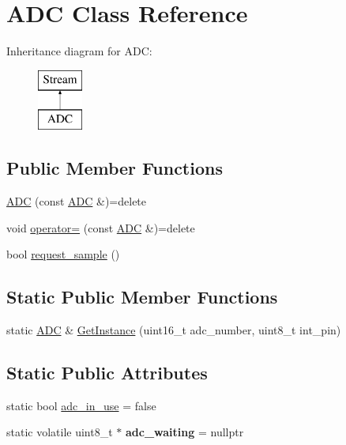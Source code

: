 \hypertarget{class_a_d_c}{}\section{A\+DC Class Reference}
\label{class_a_d_c}
Inheritance diagram for A\+DC\+:\begin{figure}[H]
\begin{center}
\leavevmode
\includegraphics[height=2.000000cm]{class_a_d_c}
\end{center}
\end{figure}
\subsection*{Public Member Functions}
\begin{DoxyCompactItemize}
\item 
\hyperlink{class_a_d_c_a50cb1d4e5bb8e3812732d9efdde4af67}{A\+DC} (const \hyperlink{class_a_d_c}{A\+DC} \&)=delete
\item 
void \hyperlink{class_a_d_c_a8cc7efa85ad7492480bdfd9f49039150}{operator=} (const \hyperlink{class_a_d_c}{A\+DC} \&)=delete
\item 
bool \hyperlink{class_a_d_c_a8264cbf9141f229f5117718e78f01173}{request\+\_\+sample} ()
\end{DoxyCompactItemize}
\subsection*{Static Public Member Functions}
\begin{DoxyCompactItemize}
\item 
static \hyperlink{class_a_d_c}{A\+DC} \& \hyperlink{class_a_d_c_aa9294ebc0b114898aa33d9e09537bdb5}{Get\+Instance} (uint16\+\_\+t adc\+\_\+number, uint8\+\_\+t int\+\_\+pin)
\end{DoxyCompactItemize}
\subsection*{Static Public Attributes}
\begin{DoxyCompactItemize}
\item 
static bool \hyperlink{class_a_d_c_a861d0d9bd4dc73f9811c129548fb9a48}{adc\+\_\+in\+\_\+use} = false
\item 
\hypertarget{class_a_d_c_a472fee5492ee8e10d5baf38b67db18af}{}\label{class_a_d_c_a472fee5492ee8e10d5baf38b67db18af} 
static volatile uint8\+\_\+t $\ast$ {\bfseries adc\+\_\+waiting} = nullptr
\end{DoxyCompactItemize}
